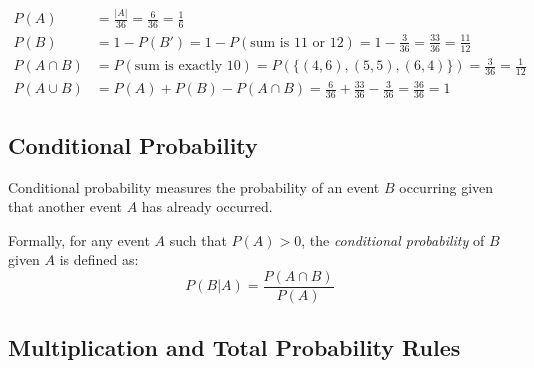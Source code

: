\begin{solution}
    \begin{align*}
        P(A) &= \frac{|A|}{36} = \frac{6}{36} = \frac{1}{6} \\
        P(B) &= 1 - P(B') = 1 - P(\text{sum is 11 or 12}) = 1 - \frac{3}{36} = \frac{33}{36} = \frac{11}{12} \\
        P(A \cap B) &= P(\text{sum is exactly 10}) = P(\{(4,6), (5,5), (6,4)\}) = \frac{3}{36} = \frac{1}{12} \\
        P(A \cup B) &= P(A) + P(B) - P(A \cap B) = \frac{6}{36} + \frac{33}{36} - \frac{3}{36} = \frac{36}{36} = 1
    \end{align*}
\end{solution}

\subsection*{Conditional Probability}

Conditional probability measures the probability of an event $B$ occurring given that another event $A$ has already occurred.

\begin{center}
    \label{fig:independence}
\end{center}

\begin{definition}
Formally, for any event $A$ such that $P(A) > 0$, the \emph{conditional probability} of $B$ given $A$ is defined as:
\[
    P(B|A) = \frac{P(A \cap B)}{P(A)}
\]
\end{definition}

\subsection*{Multiplication and Total Probability Rules}

